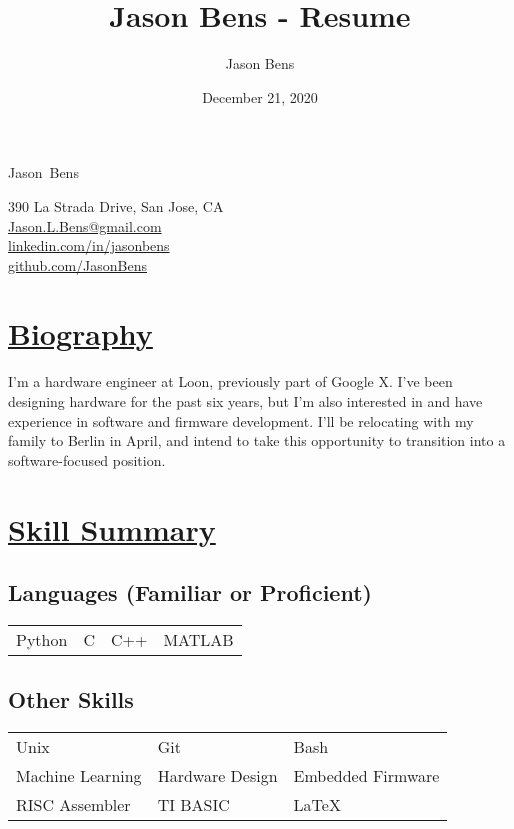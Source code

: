 \documentclass[a4paper, 11pt]{article}
\title{Jason Bens - Resume}
\author{Jason Bens}
\date{December 21, 2020}
\makeatletter
\newcommand {\firstname} {Jason}
\newcommand {\lastname} {Bens}
\newcommand {\address} {390 La Strada Drive, San Jose, CA}
\newcommand {\email} {\url{Jason.L.Bens@gmail.com}}
\newcommand {\linkedin} {\url{linkedin.com/in/jasonbens}}
\newcommand {\github} {\url{github.com/JasonBens}}
\newcommand {\careers} {\url{careers.stackoverflow.com/JasonBens}}
\makeatother
\begin{document}
\begin{minipage}[t]{0.4\textwidth}  
  \begin{flushright}
    {\Huge \firstname~\lastname}
  \end{flushright}
\end{minipage}
\hfill
\begin{minipage}{0.42\textwidth}
  \begin{flushright}
    \address \\
    \email \\
    \linkedin \\
    \github \\
  \end{flushright}
\end{minipage}

\hrulefill

\section{\underline{Biography}}
I'm a hardware engineer at Loon, previously part of Google X.  I've been designing hardware for the past six years, but I'm also interested in and have experience in software and firmware development.  I'll be relocating with my family to Berlin in April, and intend to take this opportunity to transition into a software-focused position.

\section{\underline{Skill Summary}}
  \subsection{Languages (Familiar or Proficient)}
  \begin{tabular}{l l l l}
    Python & C & C++ & MATLAB \\
  \end{tabular}
  \subsection{Other Skills}
  \begin{tabular}{l l l}
    Unix & Git & Bash \\
    Machine Learning & Hardware Design & Embedded Firmware \\
    RISC Assembler & TI BASIC & \LaTeX
  \end{tabular}
\end{document}
